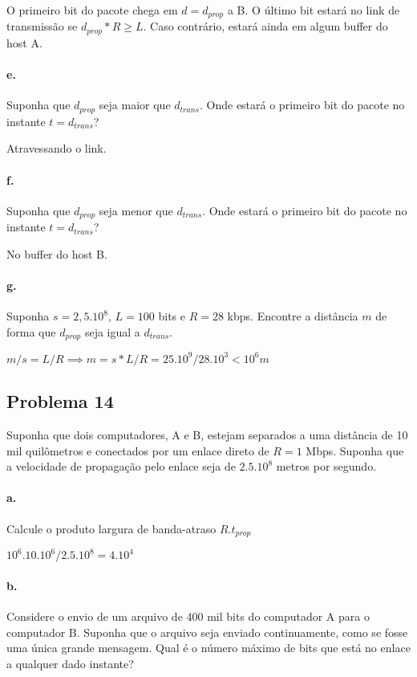 O primeiro bit do pacote chega em $d = d_{prop}$ a B. O último bit estará no link de transmissão se $d_{prop} * R \geq L$. Caso contrário, estará ainda em algum buffer do host A.

\paragraph{e.} Suponha que $d_{prop}$ seja maior que $d_{trans}$. Onde estará o primeiro bit do pacote no instante $t = d_{trans}$?

Atravessando o link.

\paragraph{f.} Suponha que $d_{prop}$ seja menor que $d_{trans}$. Onde estará o primeiro bit do pacote no instante $t = d_{trans}$?

No buffer do host B.

\paragraph{g.} Suponha $s = 2,5 . 10^8$, $L = 100$ bits e $R = 28$ kbps. Encontre a distância $m$ de forma que $d_{prop}$ seja igual a $d_{trans}$.

$m/s = L/R \implies m = s*L/R = 25.10^9 / 28.10^3 < 10^6 m$

\subsection{Problema 14}
Suponha que dois computadores, A e B, estejam separados a uma distância de 10 mil quilômetros e conectados por um enlace direto de $R = 1$ Mbps. Suponha que a velocidade de propagação pelo enlace seja de $2.5 . 10^8$ metros por segundo.

\paragraph{a.} Calcule o produto largura de banda-atraso $R . t_{prop}$

$10^6 . 10. 10^6 / 2.5 . 10^8 = 4 . 10^4$

\paragraph{b.} Considere o envio de um arquivo de 400 mil bits do computador A para o computador B. Suponha que o arquivo seja enviado continuamente, como se fosse uma única grande mensagem. Qual é o número máximo de bits que está no enlace a qualquer dado instante?

